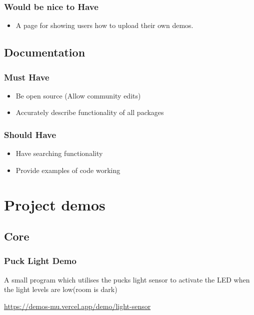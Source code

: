 \documentclass{l4proj}
\begin{document}
\begin{appendices}
\subsection{Would be nice to Have}
\begin{itemize}
    \item A page for showing users how to upload their own demos.
\end{itemize}


\section{Documentation}
\subsection{Must Have}
\begin{itemize}
    \item Be open source (Allow community edits)
    \item Accurately describe functionality of all packages
\end{itemize}
\subsection{Should Have}
\begin{itemize}
    \item Have searching functionality
    \item Provide examples of code working
\end{itemize}

\chapter{Project demos}


\label{appendix:projdemos}

\section{Core}

\subsection{Puck Light Demo}
A small program which utilises the pucks light sensor to activate the LED when the light levels are low(room is dark)


\href{https://demos-mu.vercel.app/demo/light-sensor}{https://demos-mu.vercel.app/demo/light-sensor}


\end{appendices}
\end{document}
